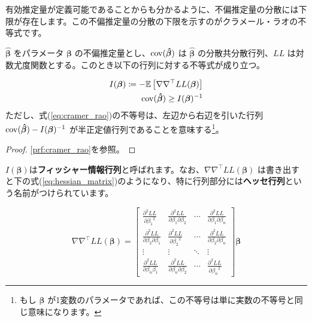 有効推定量が定義可能であることからも分かるように、不偏推定量の分散には下限が存在します。この不偏推定量の分散の下限を示すのがクラメール・ラオの不等式です。

\begin{theorem}
    \label{it:cramer_rao}
    $\bm{\hat\beta}$ をパラメータ $\bm\beta$ の不偏推定量とし、$\operatorname*{cov}(\bm{\hat\beta})$ は $\bm{\hat\beta}$ の分散共分散行列、$LL$ は対数尤度関数とする。このとき以下の行列に対する不等式が成り立つ。
    
    \begin{align}
        \label{eq:fisher_information}
        I(\bm\beta) \coloneqq -\mathbb{E}\left[\nabla\nabla^\top LL(\bm\beta)\right] \\  
        \label{eq:cramer_rao}
        \operatorname*{cov}(\bm{\hat\beta}) \ge I(\bm\beta)^{-1}
    \end{align}
    ただし、式(\ref{eq:cramer_rao})の不等号は、左辺から右辺を引いた行列 $\operatorname*{cov}(\bm{\hat\beta})-I(\bm\beta)^{-1}$ が半正定値行列であることを意味する\footnote{もし $\bm\beta$ が1変数のパラメータであれば、この不等号は単に実数の不等号と同じ意味になります。}。
\end{theorem}
\begin{proof}
    \ref{prf:cramer_rao}を参照。
\end{proof}

$I(\bm\beta)$は\textbf{フィッシャー情報行列}と呼ばれます。なお、$\nabla\nabla^\top LL(\bm\beta)$ は書き出すと下の式(\ref{eq:hessian_matrix})のようになり、特に行列部分には\textbf{ヘッセ行列}という名前がつけられています。

\begin{equation}
    \label{eq:hessian_matrix}
    \nabla\nabla^\top LL(\bm\beta) = \begin{bmatrix}
        \frac{\partial^2 LL}{\partial {\beta_1}^2}              & \frac{\partial^2 LL}{\partial \beta_1 \partial \beta_2} & \cdots & \frac{\partial^2 LL}{\partial \beta_1 \partial \beta_n}  \\
        \frac{\partial^2 LL}{\partial \beta_2 \partial \beta_1} & \frac{\partial^2 LL}{\partial {\beta_2}^2}              & \cdots & \frac{\partial^2 LL}{\partial \beta_2 \partial \beta_n } \\
        \vdots                                                  & \vdots                                                  & \ddots & \vdots                                                   \\
        \frac{\partial^2 LL}{\partial \beta_n \beta_1}          & \frac{\partial^2 LL}{\partial \beta_n \partial \beta_2} & \cdots & \frac{\partial^2 LL}{\partial {\beta_n}^2}
    \end{bmatrix} \bm\beta
\end{equation}

